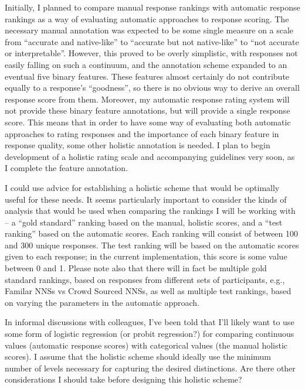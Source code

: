 \documentclass[11pt]{article}
\begin{document}
Initially, I planned to compare manual response rankings with automatic response rankings as a way of evaluating automatic approaches to response scoring. The necessary manual annotation was expected to be some single measure on a scale from ``accurate and native-like'' to ``accurate but not native-like'' to ``not accurate or interpretable''. However, this proved to be overly simplistic, with responses not easily falling on such a continuum, and the annotation scheme expanded to an eventual five binary features. These features almost certainly do not contribute equally to a response's ``goodness'', so there is no obvious way to derive an overall response score from them. Moreover, my automatic response rating system will not provide these binary feature annotations, but will provide a single response score. This means that in order to have some way of evaluating both automatic approaches to rating responses and the importance of each binary feature in response quality, some other holistic annotation is needed. I plan to begin development of a holistic rating scale and accompanying guidelines very soon, as I complete the feature annotation. 

I could use advice for establishing a holistic scheme that would be optimally useful for these needs. It seems particularly important to consider the kinds of analysis that would be used when comparing the rankings I will be working with -- a ``gold standard'' ranking based on the manual, holistic scores, and a ``test ranking'' based on the automatic scores. Each ranking will consist of between 100 and 300 unique responses. The test ranking will be based on the automatic scores given to each response; in the current implementation, this score is some value between 0 and 1. Please note also that there will in fact be multiple gold standard rankings, based on responses from different sets of participants, e.g., Familar NNSs vs Crowd Sourced NNSs, as well as multiple test rankings, based on varying the parameters in the automatic approach.

In informal discussions with colleagues, I've been told that I'll likely want to use some form of logistic regression (or probit regression?) for comparing continuous values (automatic response scores) with categorical values (the manual holistic scores). I assume that the holistic scheme should ideally use the minimum number of levels necessary for capturing the desired distinctions. Are there other considerations I should take before designing this holistic scheme?
\end{document}

